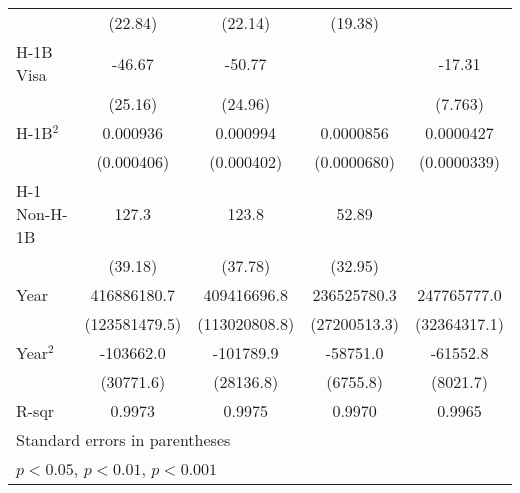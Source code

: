 \begin{tabular}{l*{4}{c}}
                             &     (22.84)         &     (22.14)         &     (19.38)         &                     \\
    \addlinespace
    H-1B Visa                &      -46.67         &      -50.77         &                     &      -17.31\sym{*}  \\
                             &     (25.16)         &     (24.96)         &                     &     (7.763)         \\
    \addlinespace
    H-1B$^2$                   &    0.000936\sym{*}  &    0.000994\sym{*}  &   0.0000856         &   0.0000427         \\
                             &  (0.000406)         &  (0.000402)         & (0.0000680)         & (0.0000339)         \\
    \addlinespace
    H-1 Non-H-1B             &       127.3\sym{**} &       123.8\sym{**} &       52.89         &                     \\
                             &     (39.18)         &     (37.78)         &     (32.95)         &                     \\
    \addlinespace
    Year                     & 416886180.7\sym{**} & 409416696.8\sym{**} & 236525780.3\sym{***}& 247765777.0\sym{***}\\
                             &(123581479.5)         &(113020808.8)         &(27200513.3)         &(32364317.1)         \\
    \addlinespace
    Year$^2$                   &   -103662.0\sym{**} &   -101789.9\sym{**} &    -58751.0\sym{***}&    -61552.8\sym{***}\\
                             &   (30771.6)         &   (28136.8)         &    (6755.8)         &    (8021.7)         \\
    \midrule
    R-sqr                    &      0.9973         &      0.9975         &      0.9970         &      0.9965         \\
    \bottomrule
    \multicolumn{5}{l}{\footnotesize Standard errors in parentheses}\\
    \multicolumn{5}{l}{\footnotesize \sym{*} \(p<0.05\), \sym{**} \(p<0.01\), \sym{***} \(p<0.001\)}\\
    \end{tabular}